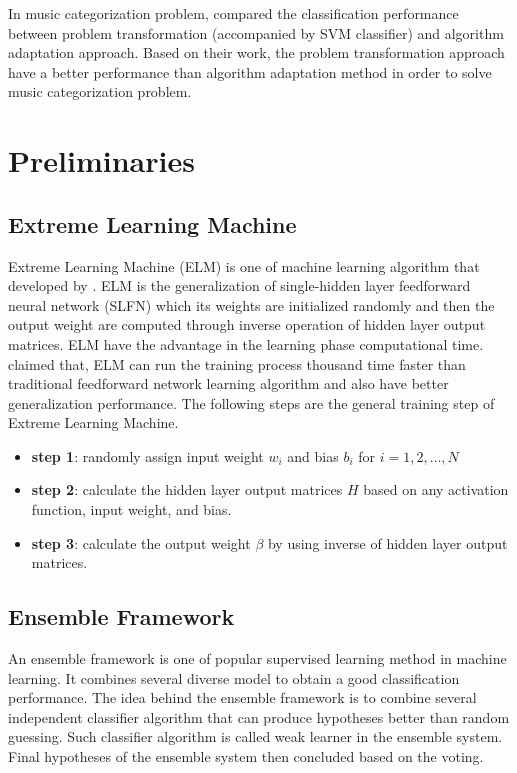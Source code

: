 \documentclass{article}
\begin{document}
In music categorization problem, \cite{Trohidis2008} compared the classification performance between problem transformation (accompanied by SVM classifier) and algorithm adaptation approach. Based on their work, the problem transformation approach have a better performance than algorithm adaptation method in order to solve music categorization problem. 


\section{Preliminaries}
\label{preliminary}

\subsection{Extreme Learning Machine}
\label{elm}

Extreme Learning Machine (ELM) is one of machine learning algorithm that developed by \cite{Huang2004}. ELM is the generalization of single-hidden layer feedforward neural network (SLFN) which its weights are initialized randomly and then the output weight are computed through inverse operation of hidden layer output matrices. ELM have the advantage in the learning phase computational time. \cite{Huang2004} claimed that, ELM can run the training process thousand time faster than traditional feedforward network learning algorithm and also have better generalization performance. The following steps are the general training step of Extreme Learning Machine.
\begin{itemize}
\item \textbf{step 1}: randomly assign input weight $w_i$ and bias $b_i$ for $i = {1,2,\dots,N}$ 
\item \textbf{step 2}: calculate the hidden layer output matrices $H$ based on any activation function, input weight, and bias. 
\item \textbf{step 3}: calculate the output weight $\beta$ by using inverse of hidden layer output matrices.
\end{itemize}


\subsection{Ensemble Framework}
\label{ensemble}

An ensemble framework is one of popular supervised learning method in machine learning. It combines several diverse model to obtain a good classification performance. The idea behind the ensemble framework is to combine several independent classifier algorithm that can produce hypotheses better than random guessing. Such classifier algorithm is called weak learner in the ensemble system. Final hypotheses of the ensemble system then concluded based on the voting.
\end{document}
